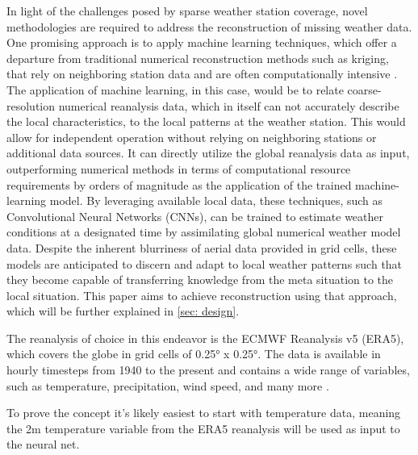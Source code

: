 In light of the challenges posed by sparse weather station coverage, novel methodologies are required to address the reconstruction of missing weather data.
One promising approach is to apply machine learning techniques, which offer a departure from traditional numerical reconstruction methods such as kriging, that rely on neighboring station data and are often computationally intensive \cite{chung2019kriging}.
The application of machine learning, in this case, would be to relate coarse-resolution numerical reanalysis data, which in itself can not accurately describe the local characteristics, to the local patterns at the weather station.
This would allow for independent operation without relying on neighboring stations or additional data sources. It can directly utilize the global reanalysis data as input, outperforming numerical methods in terms of computational resource requirements by orders of magnitude \cite{kurth2023MLperformance,bi2023MLperformance,lam2023MLperformance} as the application of the trained machine-learning model.
By leveraging available local data, these techniques, such as Convolutional Neural Networks (CNNs), can be trained to estimate weather conditions at a designated time by assimilating global numerical weather model data.
Despite the inherent blurriness of aerial data provided in grid cells, these models are anticipated to discern and adapt to local weather patterns such that they become capable of transferring knowledge from the meta situation to the local situation.
This paper aims to achieve reconstruction using that approach, which will be further explained in \autoref{sec: design}.


The reanalysis of choice in this endeavor is the ECMWF Reanalysis v5 (ERA5), which covers the globe in grid cells of 0.25° x 0.25°.
The data is available in hourly timesteps from 1940 to the present and contains a wide range of variables, such as temperature, precipitation, wind speed, and many more \cite{era5}.


To prove the concept it's likely easiest to start with temperature data, meaning the 2m temperature variable from the ERA5 reanalysis will be used as input to the neural net.
